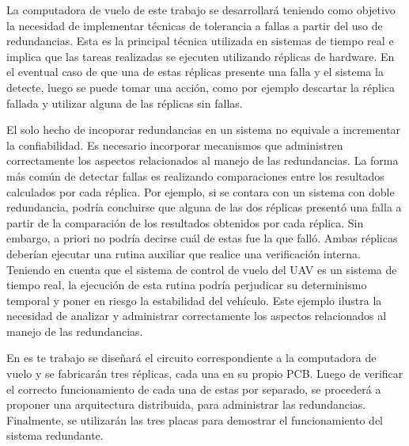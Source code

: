 La computadora de vuelo de este trabajo se desarrollará teniendo como objetivo la necesidad de implementar técnicas de tolerancia a fallas a partir del uso de redundancias. Esta es la principal técnica utilizada en sistemas de tiempo real \cite{nelson1990fault} e implica que las tareas realizadas se ejecuten utilizando réplicas de hardware. En el eventual caso de que una de estas réplicas presente una falla y el sistema la detecte, luego se puede tomar una acción, como por ejemplo descartar la réplica fallada y utilizar alguna de las réplicas sin fallas. 

El solo hecho de incoporar redundancias en un sistema no equivale a incrementar la confiabilidad. Es necesario incorporar mecanismos que administren correctamente los aspectos relacionados al manejo de las redundancias. La forma más común de detectar fallas es realizando comparaciones entre los resultados calculados por cada réplica. Por ejemplo, si se contara con un sistema con doble redundancia, podría concluirse que alguna de las dos réplicas presentó una falla a partir de la comparación de los resultados obtenidos por cada réplica. Sin embargo, a priori no podría decirse cuál de estas fue la que falló. Ambas réplicas deberían ejecutar una rutina auxiliar que realice una verificación interna. Teniendo en cuenta que el sistema de control de vuelo del UAV es un sistema de tiempo real, la ejecución de esta rutina podría perjudicar su determinismo temporal y poner en riesgo la estabilidad del vehículo. Este ejemplo ilustra la necesidad de analizar y administrar correctamente los aspectos relacionados al manejo de las redundancias.

En es te trabajo se diseñará el circuito correspondiente a la computadora de vuelo y se fabricarán tres réplicas, cada una en su propio PCB. Luego de verificar el correcto funcionamiento de cada una de estas por separado, se procederá a proponer una arquitectura distribuida, para administrar las redundancias. Finalmente, se utilizarán las tres placas para demostrar el funcionamiento del sistema redundante.



